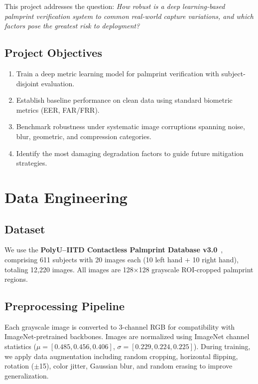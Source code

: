 \documentclass[conference]{IEEEtran}
\begin{document}
This project addresses the question: \textit{How robust is a deep learning-based palmprint verification system to common real-world capture variations, and which factors pose the greatest risk to deployment?}

\subsection{Project Objectives}

\begin{enumerate}
    \item Train a deep metric learning model for palmprint verification with subject-disjoint evaluation.
    \item Establish baseline performance on clean data using standard biometric metrics (EER, FAR/FRR).
    \item Benchmark robustness under systematic image corruptions spanning noise, blur, geometric, and compression categories.
    \item Identify the most damaging degradation factors to guide future mitigation strategies.
\end{enumerate}

\section{Data Engineering}

\subsection{Dataset}

We use the \textbf{PolyU--IITD Contactless Palmprint Database v3.0}~\cite{polyu}, comprising 611 subjects with 20 images each (10 left hand + 10 right hand), totaling 12,220 images. All images are 128$\times$128 grayscale ROI-cropped palmprint regions.

\subsection{Preprocessing Pipeline}

Each grayscale image is converted to 3-channel RGB for compatibility with ImageNet-pretrained backbones. Images are normalized using ImageNet channel statistics ($\mu = [0.485, 0.456, 0.406]$, $\sigma = [0.229, 0.224, 0.225]$). During training, we apply data augmentation including random cropping, horizontal flipping, rotation ($\pm$15\textdegree), color jitter, Gaussian blur, and random erasing to improve generalization.
\end{document}
